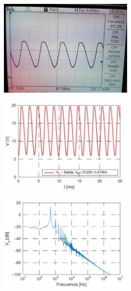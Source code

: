 \documentclass[a4paper, 10pt, spanish]{article}
\begin{document}
        \begin{center}
          \includegraphics[width=0.5\textwidth]{med_oscilador_cc.png}
          \label{fig:med_out_oscilador}
        \end{center}

        \begin{center}
          \includegraphics[width=0.5\textwidth]{salida_oscilador.png}
          \label{fig:sim_out_oscilador}
        \end{center}


        \begin{center}
          \includegraphics[width=0.5\textwidth]{fft_oscilador.png}
          \label{fig:fft}
        \end{center}








\end{document}
